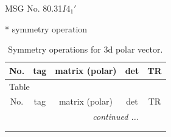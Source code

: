 \documentclass[fleqn,8pt]{jsarticle}
\begin{document}
\setcounter{MaxMatrixCols}{32}

\renewcommand{\tablename}{Table~}
\renewcommand{\figurename}{Figure~}
\begin{center}
\LARGE
MSG No. 80.31\quad$I4_{1}'$
\end{center}
* symmetry operation
\renewcommand{\arraystretch}{1.3}
\begin{longtable}{ccccc}
\caption{Symmetry operations for 3d polar vector.}
 \\
 \hline \hline
No. & tag & matrix (polar) & det & TR \\ \hline \endfirsthead

\multicolumn{4}{l}{\tablename\ \thetable{}} \\
 \hline \hline
No. & tag & matrix (polar) & det & TR \\ \hline \endhead

 \hline \hline
\multicolumn{4}{r}{\footnotesize\it continued ...} \\ \endfoot

 \hline \hline
\multicolumn{4}{r}{} \\ \endlastfoot


\end{longtable}
\end{document}
